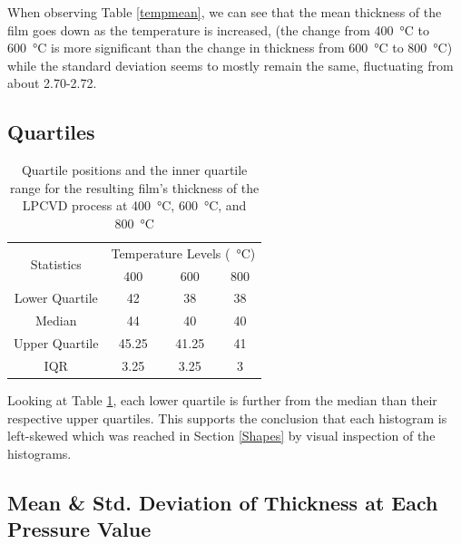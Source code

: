 \documentclass[letterpaper]{article}
\begin{document}
When observing Table \ref{tempmean}, we can see that the mean thickness of the film goes down as the temperature
is increased, (the change from \SI{400}{\celsius} to \SI{600}{\celsius} is more significant than the change in thickness from \SI{600}{\celsius} to \SI{800}{\celsius}) while the standard deviation seems to mostly remain the same,
fluctuating from about 2.70-2.72.

\subsection{Quartiles}

\begin{table}[H]
 \centering
 \begin{tabular}{c|c|c|c|}
  \multirow{2}{*}{Statistics} & \multicolumn{3}{c|}{Temperature Levels (\SI{}{\celsius})}               \\ \cline{2-4}
                              & 400                                                       & 600   & 800 \\ \hline
  Lower Quartile              & 42                                                        & 38    & 38  \\ \hline
  Median                      & 44                                                        & 40    & 40  \\ \hline
  Upper Quartile              & 45.25                                                     & 41.25 & 41  \\ \hline
  IQR                         & 3.25                                                      & 3.25  & 3   \\ \hline
 \end{tabular}
 \caption{Quartile positions and the inner quartile range for the resulting film's thickness of the LPCVD process at \SI{400}{\celsius}, \SI{600}{\celsius}, and \SI{800}{\celsius}}
 \label{tempquart}
\end{table}

Looking at Table \ref{tempquart}, each lower quartile is further from the median than their respective
upper quartiles. This supports the conclusion that each histogram is left-skewed
which was reached in Section \ref{Shapes} by visual inspection of the histograms.
\subsection{Mean \& Std. Deviation of Thickness at Each Pressure Value}
\end{document}
